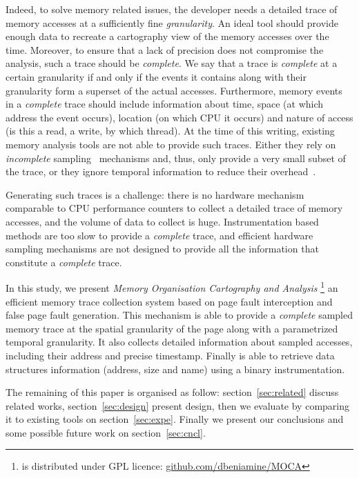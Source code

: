 Indeed, to solve memory related issues, the developer needs a detailed trace of memory
accesses at a sufficiently fine \emph{granularity}.
An ideal tool should provide enough data to recreate a cartography view
of the memory accesses over the time.
Moreover, to ensure that a lack of precision
does not compromise the analysis, such a trace should be \emph{complete}. We say that a trace is
\emph{complete} at a certain granularity if and only if the events it contains along with their granularity
form a superset of the actual accesses. Furthermore, memory events in a \emph{complete} trace should
include information about time, space (at which address the event occurs),
location (on which CPU it occurs) and nature of access (is this
a read, a write, by which thread).
At the time of this writing, existing memory analysis tools are not able to provide such traces.
Either they rely on \emph{incomplete} sampling~\cite{Liu14Tool,Lachaize12MemProf}
mechanisms and, thus, only provide a very small subset of the trace, or they
ignore temporal information to reduce their
overhead~\cite{Beniamine15TABARNACRR}.

Generating such traces is a challenge: there is no hardware mechanism
comparable to CPU performance counters to collect a detailed trace of memory accesses, and the volume
of data to collect is huge. Instrumentation based methods are too slow
to provide a \emph{complete} trace, and efficient hardware sampling mechanisms are not designed
to provide all the information that constitute a \emph{complete} trace.

In this study, we present \emph{Memory Organisation Cartography and Analysis}
\footnote{\Moca is distributed under GPL licence:
    \href{https://github.com/dbeniamine/MOCA}{github.com/dbeniamine/MOCA}}
an efficient memory trace collection system based on page fault interception
and false page fault generation.
This mechanism is able to provide a \emph{complete} sampled memory trace at
the spatial granularity of the page along with a parametrized temporal granularity.
It also collects detailed information about sampled accesses, including their address and
precise timestamp. Finally \Moca is able to retrieve data structures
information (address, size and name) using a binary instrumentation.

The remaining of this paper is organised as follow: section~\ref{sec:related}
discuss related works, section~\ref{sec:design} present \Moca design, then we
evaluate \Moca by comparing it to existing tools on section~\ref{sec:expe}.
Finally we present our conclusions and some possible future work on
section~\ref{sec:cncl}.
